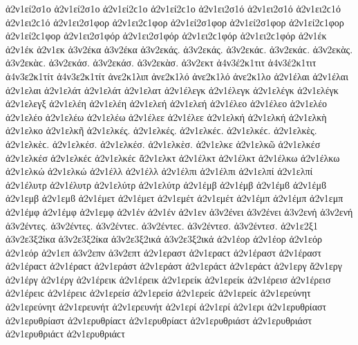{ἀ2ν1εί2σ1ο ἀ2ν1εί2σ1ο ἀ2ν1εί2ϲ1ο ἀ2ν1εί2ϲ1ο   %
ἀ2ν1ει2σ1ό ἀ2ν1ει2σ1ό ἀ2ν1ει2ϲ1ό ἀ2ν1ει2ϲ1ό
ἀ2ν1ει2σ1φορ ἀ2ν1ει2ϲ1φορ   %
ἀ2ν1εί2σ1φορ ἀ2ν1εί2σ1φορ ἀ2ν1εί2ϲ1φορ ἀ2ν1εί2ϲ1φορ   %
ἀ2ν1ει2σ1φόρ ἀ2ν1ει2σ1φόρ ἀ2ν1ει2ϲ1φόρ ἀ2ν1ει2ϲ1φόρ
ἀ2ν1έκ ἀ2ν1έκ   %
ἀ2ν1εκ
ἀ3ν2έκα ἀ3ν2έκα   %
ἀ3ν2εκάς. ἀ3ν2εκάς. ἀ3ν2εκάϲ. ἀ3ν2εκάϲ.   %
ἀ3ν2εκὰς. ἀ3ν2εκὰϲ.
ἀ3ν2εκάσ. ἀ3ν2εκάσ.
ἀ3ν2εκὰσ.
ἀ3ν2εκτ   %
ἀ4ν3έ2κ1τιτ ἀ4ν3έ2κ1τιτ   %
ἀ4ν3ε2κ1τίτ ἀ4ν3ε2κ1τίτ
ἀνε2κ1λιπ   %
ἀνε2κ1λό ἀνε2κ1λό   %
ἀνε2κ1λο
ἀ2ν1έλαι ἀ2ν1έλαι   %
ἀ2ν1ελαι
ἀ2ν1ελάτ ἀ2ν1ελάτ   %
ἀ2ν1ελατ
ἀ2ν1έλεγκ ἀ2ν1έλεγκ   %
ἀ2ν1ελέγκ ἀ2ν1ελέγκ
ἀ2ν1ελεγξ   %
ἀ2ν1ελέη ἀ2ν1ελέη   %
ἀ2ν1ελεή ἀ2ν1ελεή
ἀ2ν1έλεο ἀ2ν1έλεο   %
ἀ2ν1ελέο ἀ2ν1ελέο
ἀ2ν1ελέω ἀ2ν1ελέω
ἀ2ν1έλεε ἀ2ν1έλεε
ἀ2ν1ελκή ἀ2ν1ελκή   %
ἀ2ν1ελκὴ
ἀ2ν1ελκο
ἀ2ν1ελκῆ
ἀ2ν1ελκές. ἀ2ν1ελκές. ἀ2ν1ελκέϲ. ἀ2ν1ελκέϲ.
ἀ2ν1ελκὲς. ἀ2ν1ελκὲϲ.
ἀ2ν1ελκέσ. ἀ2ν1ελκέσ.
ἀ2ν1ελκὲσ.
ἀ2ν1ελκε
ἀ2ν1ελκῶ
ἀ2ν1ελκέσ ἀ2ν1ελκέσ ἀ2ν1ελκέϲ ἀ2ν1ελκέϲ
ἄ2ν1ελκτ   %
ἀ2ν1έλκτ ἀ2ν1έλκτ
ἀ2ν1έλκω ἀ2ν1έλκω   %
ἀ2ν1ελκώ ἀ2ν1ελκώ
ἀ2ν1έλλ ἀ2ν1έλλ   %
ἀ2ν1έλπι ἀ2ν1έλπι   %
ἀ2ν1ελπί ἀ2ν1ελπί
ἀ2ν1έλυτρ ἀ2ν1έλυτρ   %
ἀ2ν1ελύτρ ἀ2ν1ελύτρ
ἀ2ν1έμβ ἀ2ν1έμβ ἀ2ν1έμϐ ἀ2ν1έμϐ %
ἀ2ν1εμβ ἀ2ν1εμϐ
ἀ2ν1έμετ ἀ2ν1έμετ   %
ἀ2ν1εμέτ ἀ2ν1εμέτ
ἀ2ν1έμπ ἀ2ν1έμπ   %
ἀ2ν1εμπ
ἀ2ν1έμφ ἀ2ν1έμφ   %
ἀ2ν1εμφ
ἀ2ν1έν ἀ2ν1έν   %
ἀ2ν1εν
ἀ3ν2ένει ἀ3ν2ένει   %
ἀ3ν2ενή ἀ3ν2ενή   %
ἀ3ν2έντες. ἀ3ν2έντες. ἀ3ν2έντεϲ. ἀ3ν2έντεϲ.   %
ἀ3ν2έντεσ. ἀ3ν2έντεσ.
ἀ2ν1ε2ξ1   %
ἀ3ν2ε3ξ2ίκα ἀ3ν2ε3ξ2ίκα   %
ἀ3ν2ε3ξ2ικά ἀ3ν2ε3ξ2ικά
ἀ2ν1έορ ἀ2ν1έορ   %
ἀ2ν1εόρ ἀ2ν1εόρ
ἀ2ν1επ   %
ἀ3ν2επν   %
ἀ3ν2επτ   %
ἀ2ν1εραστ ἀ2ν1εραϲτ   %
ἀ2ν1έραστ ἀ2ν1έραστ ἀ2ν1έραϲτ ἀ2ν1έραϲτ   %
ἀ2ν1εράστ ἀ2ν1εράστ ἀ2ν1εράϲτ ἀ2ν1εράϲτ
ἀ2ν1εργ   %
ἄ2ν1εργ   %
ἀ2ν1έργ ἀ2ν1έργ
ἀ2ν1έρεικ ἀ2ν1έρεικ   %
ἀ2ν1ερείκ ἀ2ν1ερείκ
ἀ2ν1έρεισ ἀ2ν1έρεισ ἀ2ν1έρειϲ ἀ2ν1έρειϲ   %
ἀ2ν1ερείσ ἀ2ν1ερείσ ἀ2ν1ερείϲ ἀ2ν1ερείϲ
ἀ2ν1ερεύνητ ἀ2ν1ερεύνητ   %
ἀ2ν1ερευνήτ ἀ2ν1ερευνήτ
ἀ2ν1ερί ἀ2ν1ερί   %
ἀ2ν1ερι
ἀ2ν1ερυθρίαστ ἀ2ν1ερυθρίαστ ἀ2ν1ερυθρίαϲτ ἀ2ν1ερυθρίαϲτ   %
ἀ2ν1ερυθριάστ ἀ2ν1ερυθριάστ ἀ2ν1ερυθριάϲτ ἀ2ν1ερυθριάϲτ
}
